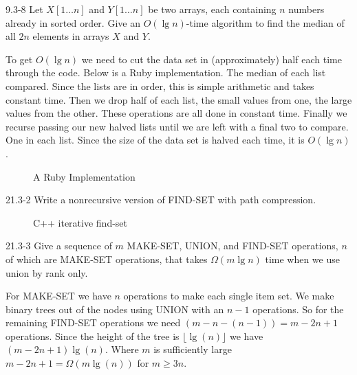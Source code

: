 \begin{problem}{9.3-8}
  Let $X[1\ldots n]$ and $Y[1\ldots n]$ be two arrays, each containing $n$ numbers already in sorted order. Give an
  $O(\lg n)$-time algorithm to find the median of all $2n$ elements in arrays $X$ and $Y$.
  \begin{solution}
    To get $O(\lg n)$ we need to cut the data set in (approximately) half each time through the code. Below is a Ruby
    implementation. The median of each list compared. Since the lists are in order, this is simple arithmetic and takes
    constant time. Then we drop half of each list, the small values from one, the large values from the other. These
    operations are all done in constant time. Finally we recurse passing our new halved lists until we are left with a
    final two to compare. One in each list. Since the size of the data set is halved each time, it is $O(\lg n)$.
    \begin{figure}[H]
      \centering
      \caption{A Ruby Implementation}
      
    \end{figure}
  \end{solution}
\end{problem}

\begin{problem}{21.3-2}
  Write a nonrecursive version of FIND-SET with path compression.
  \begin{solution}
    \begin{figure}[H]
      \centering
      \caption{C++ iterative find-set}
      
    \end{figure}
  \end{solution}
\end{problem}

\begin{problem}{21.3-3}
  Give a sequence of $m$ MAKE-SET, UNION, and FIND-SET operations, $n$ of which are MAKE-SET operations, that takes
  $\Omega(m \lg n)$ time when we use union by rank only.
  \begin{solution}
    For MAKE-SET we have $n$ operations to make each single item set. We make binary trees out of the nodes using UNION
    with an $n-1$ operations. So for the remaining FIND-SET operations we need $(m - n - (n - 1)) = m -2n + 1$
    operations. Since the height of the tree is $\lfloor \lg(n) \rfloor$ we have $(m - 2n + 1)\lg(n)$. Where $m$ is
    sufficiently large $m - 2n + 1 = \Omega(m\lg(n))$ for $m \ge 3n$.
  \end{solution}
\end{problem}


